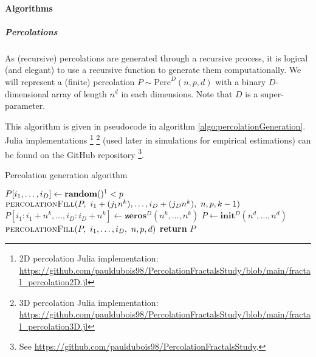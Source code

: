 \paragraph{Algorithms}
\subparagraph{Percolations}
As (recursive) percolations are generated through a recursive process, it is logical (and elegant) to use a recursive function to generate them computationally.
We will represent a (finite) percolation $P \sim \text{Perc}^D(n,p,d)$ with a binary $D$-dimensional array of length $n^d$ in each dimensions.
Note that $D$ is a super-parameter.

This algorithm is given in pseudocode in algorithm \ref{algo:percolationGeneration}. Julia implementations
\footnote{2D percolation Julia implementation: \url{https://github.com/pauldubois98/PercolationFractalsStudy/blob/main/fractal\_percolation2D.jl}}
\footnote{3D percolation Julia implementation: \url{https://github.com/pauldubois98/PercolationFractalsStudy/blob/main/fractal\_percolation3D.jl}}
(used later in simulations for empirical estimations) can be found on the GitHub repository
\footnote{See \url{https://github.com/pauldubois98/PercolationFractalsStudy}.}.

\begin{algorithm}[!h]
	\caption{Percolation generation algorithm}\label{algo:percolationGeneration}
	\begin{algorithmic}[1]
		\State $P[i_1,\dots,i_D] \gets \textbf{random}()\footnotemark < p$ 
		\Else
		\State $\textsc{percolationFill}(P, \ i_1+(j_1 n^k),\dots,i_D+(j_D n^k), \ n, p, k-1)$ 
		\Else
		\State $P[i_1:i_1+n^k,\dots,i_D:i_D+n^k] \gets \textbf{zeros$^D$}(n^k,\dots,n^k)$ 
		\EndIf
		\EndFor
		\EndIf
		\EndProcedure
		\State $P \gets \textbf{init$^D$}(n^d,\dots,n^d)$
		\State $\textsc{percolationFill}(P, \ i_1,\dots,i_D, \ n, p, d)$ 
		\State \textbf{return} $P$
		\EndProcedure
	\end{algorithmic}
\end{algorithm}
\addtocounter{footnote}{-1}
\addtocounter{footnote}{-1}

